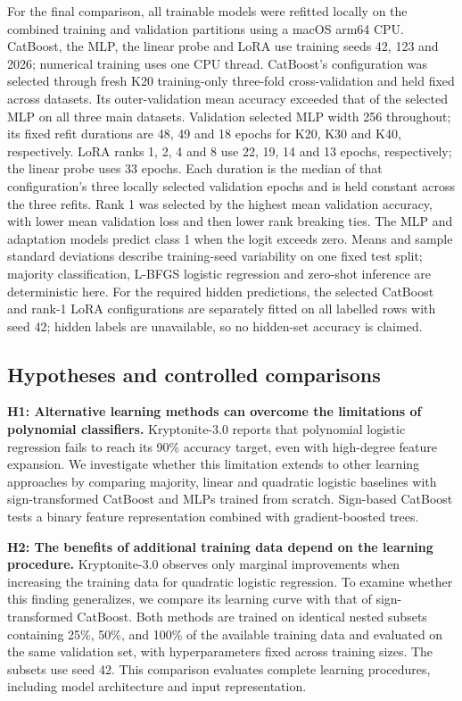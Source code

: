 \documentclass{article}
\begin{document}
For the final comparison, all trainable models were refitted locally on the combined training and validation partitions using a macOS arm64 CPU. CatBoost, the MLP, the linear probe and LoRA use training seeds 42, 123 and 2026; numerical training uses one CPU thread. CatBoost's configuration was selected through fresh K20 training-only three-fold cross-validation and held fixed across datasets. Its outer-validation mean accuracy exceeded that of the selected MLP on all three main datasets. Validation selected MLP width 256 throughout; its fixed refit durations are 48, 49 and 18 epochs for K20, K30 and K40, respectively. LoRA ranks 1, 2, 4 and 8 use 22, 19, 14 and 13 epochs, respectively; the linear probe uses 33 epochs. Each duration is the median of that configuration's three locally selected validation epochs and is held constant across the three refits. Rank 1 was selected by the highest mean validation accuracy, with lower mean validation loss and then lower rank breaking ties. The MLP and adaptation models predict class 1 when the logit exceeds zero. Means and sample standard deviations describe training-seed variability on one fixed test split; majority classification, L-BFGS logistic regression and zero-shot inference are deterministic here. For the required hidden predictions, the selected CatBoost and rank-1 LoRA configurations are separately fitted on all labelled rows with seed 42; hidden labels are unavailable, so no hidden-set accuracy is claimed.

\subsection{Hypotheses and controlled comparisons}
\textbf{H1: Alternative learning methods can overcome the limitations of polynomial classifiers.} Kryptonite-3.0 reports that polynomial logistic regression fails to reach its 90\% accuracy target, even with high-degree feature expansion. We investigate whether this limitation extends to other learning approaches by comparing majority, linear and quadratic logistic baselines with sign-transformed CatBoost and MLPs trained from scratch. Sign-based CatBoost tests a binary feature representation combined with gradient-boosted trees.

\textbf{H2: The benefits of additional training data depend on the learning procedure.} Kryptonite-3.0 observes only marginal improvements when increasing the training data for quadratic logistic regression. To examine whether this finding generalizes, we compare its learning curve with that of sign-transformed CatBoost. Both methods are trained on identical nested subsets containing 25\%, 50\%, and 100\% of the available training data and evaluated on the same validation set, with hyperparameters fixed across training sizes. The subsets use seed 42. This comparison evaluates complete learning procedures, including model architecture and input representation.
\end{document}
